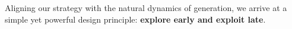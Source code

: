 %
Aligning our strategy with the natural dynamics of generation, we arrive at a simple yet powerful design principle: \textbf{explore early and exploit late}.

%

%


